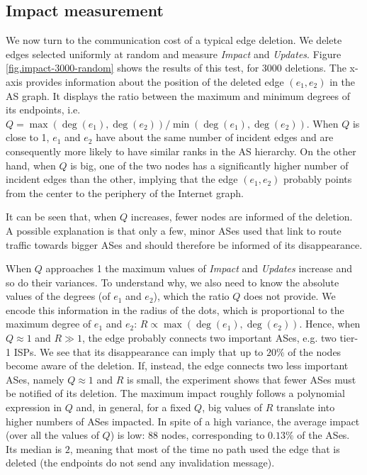 \documentclass[a4paper,11pt,oneside]{report}
\begin{document}
\subsection{Impact measurement}
\label{sub.impact-measurement}
We now turn to the communication cost of a typical edge deletion. We delete edges selected uniformly at random and measure \textit{Impact} and \textit{Updates}. Figure \ref{fig.impact-3000-random} shows the results of this test, for 3000 deletions. The x-axis provides information about the position of the deleted edge $(e_1, e_2)$ in the AS graph. It displays the ratio between the maximum and minimum degrees of its endpoints, i.e. $Q = \max(\deg(e_1), \deg(e_2))/\min(\deg(e_1), \deg(e_2))$. When $Q$ is close to 1, $e_1$ and $e_2$ have about the same number of incident edges and are consequently more likely to have similar ranks in the AS hierarchy. On the other hand, when $Q$ is big, one of the two nodes has a significantly higher number of incident edges than the other, implying that the edge $(e_1, e_2)$ probably points from the center to the periphery of the Internet graph.

It can be seen that, when $Q$ increases, fewer nodes are informed of the deletion. A possible explanation is that only a few, minor ASes used that link to route traffic towards bigger ASes and should therefore be informed of its disappearance.

When $Q$ approaches 1 the maximum values of \textit{Impact} and \textit{Updates} increase and so do their variances. To understand why, we also need to know the absolute values of the degrees (of $e_1$ and $e_2$), which the ratio $Q$ does not provide. We encode this information in the radius of the dots, which is proportional to the maximum degree of $e_1$ and $e_2$: $R \propto \max(\deg(e_1), \deg(e_2))$.
Hence, when $Q \approx 1$ and $R \gg 1$, the edge probably connects two important ASes, e.g. two tier-1 ISPs. We see that its disappearance can imply that up to $20\%$ of the nodes become aware of the deletion. If, instead, the edge connects two less important ASes, namely $Q \approx 1$ and $R$ is small, the experiment shows that fewer ASes must be notified of its deletion. The maximum impact roughly follows a polynomial expression in $Q$ and, in general, for a fixed $Q$, big values of $R$ translate into higher numbers of ASes impacted.
In spite of a high variance, the average impact (over all the values of $Q$) is low: $88$ nodes, corresponding to $0.13\%$ of the ASes. Its median is $2$, meaning that most of the time no path used the edge that is deleted (the endpoints do not send any invalidation message).
\end{document}
